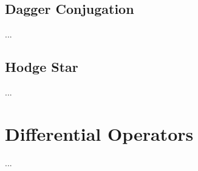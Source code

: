 \subsection{Dagger Conjugation}
...
\subsection{Hodge Star}
...
\section{Differential Operators}
...